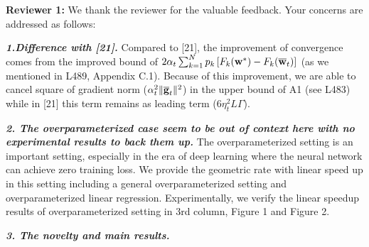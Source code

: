 {\color{blue}\textbf{Reviewer 1:}} We thank the reviewer for the valuable feedback. Your concerns are addressed as follows: 

\textbf{\textit{1.Difference with [21].}} Compared to [21], the improvement 
of convergence comes from the improved bound of $2\alpha_{t}\sum_{k=1}^{N}p_{k}\left[F_{k}({\mathbf{w}}^{\ast})-F_{k}({\overline{\mathbf{w}}}_{t})\right]$ (as we mentioned in L489, Appendix C.1). Because of this improvement, we are able to cancel square of gradient norm ($\alpha_{t}^{2}\|{\overline{\mathbf{g}}}_{t}\|^{2}$) in the upper bound of A1 (see L483) while in [21] this term remains as leading term ($6\eta_t^2L \Gamma$).

\textbf{\textit{2. The overparameterized case seem to be out of context here with no experimental results to back them up.}} The overparameterized 
setting is an important setting, especially in the era of deep learning
where the neural network can achieve zero training loss. We provide the 
geometric rate with linear speed up in this setting including a general overparameterized setting and overparameterized linear regression. 
Experimentally, we verify the linear speedup results of overparameterized setting in 3rd column, Figure 1 and Figure 2. 

\textbf{\textit{3. The novelty and main results.}}


